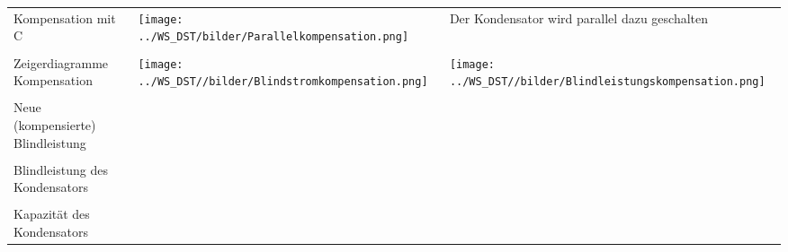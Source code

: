 
\begin{tabular}{p{7cm}p{4.5cm}p{5cm}}
	Kompensation mit C &
    	\begin{minipage}{4cm}
        	\texttt{[image: ../WS\_DST/bilder/Parallelkompensation.png]}
        \end{minipage} & 
		Der Kondensator wird parallel dazu geschalten \\ \\
	Zeigerdiagramme Kompensation &
		\begin{minipage}{4.5cm}
        	\texttt{[image: ../WS\_DST//bilder/Blindstromkompensation.png]}
        \end{minipage} &
		\begin{minipage}{4.5cm}
        	\texttt{[image: ../WS\_DST//bilder/Blindleistungskompensation.png]}
        \end{minipage} \\ \\
	Neue (kompensierte) Blindleistung &
		\fbox{$Q_{Lk} = P \cdot \tan{\varphi_k}$} \\ \\
	Blindleistung des Kondensators &
		\fbox{$Q_C = Q_{Lk} - Q_L$} \\ \\
	Kapazität des Kondensators &
		\fbox{$C = -\frac{Q_C}{\omega U^2}$} \\
\end{tabular}